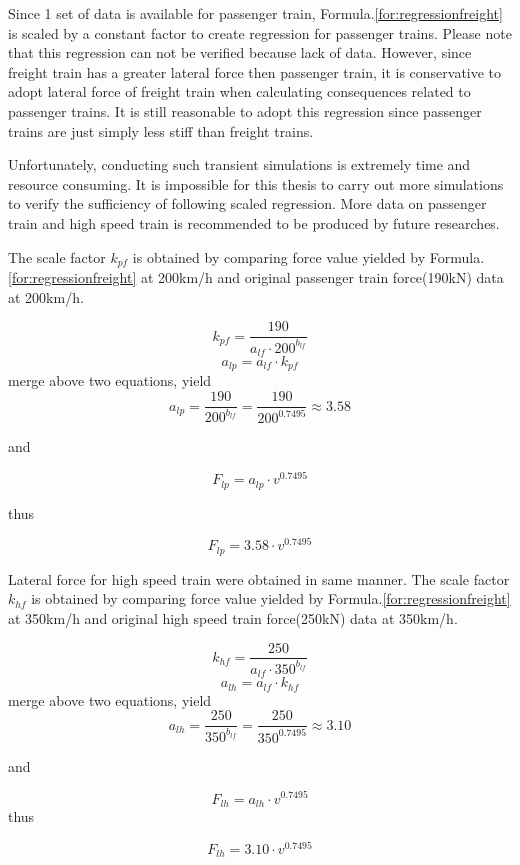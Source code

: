Since 1 set of data is available for passenger train, Formula.\ref{for:regressionfreight} is scaled by a constant factor to create regression for passenger trains. Please note that this regression can not be verified because lack of data. However, since freight train has a greater lateral force then passenger train, it is conservative to adopt lateral force of freight train when calculating consequences related to passenger trains. It is still reasonable to adopt this regression since passenger trains are just simply less stiff than freight trains. 

Unfortunately, conducting such transient simulations is extremely time and resource consuming. It is impossible for this thesis to carry out more simulations to verify the sufficiency of following scaled regression. More data on passenger train and high speed train is recommended to be produced by future researches.

The scale factor $k_{pf}$ is obtained by comparing force value yielded by Formula.\ref{for:regressionfreight} at 200km/h and original passenger train force(190kN) data at 200km/h.

$$k_{pf} = \frac{190}{a_{lf}\cdot 200^{b_{lf}}}$$
$$a_{lp} = a_{lf}\cdot k_{pf}$$
merge above two equations, yield
$$a_{lp} = \frac{190}{200^{b_{lf}}} = \frac{190}{200^{0.7495}} \approx 3.58$$

and 

$$F_{lp} = a_{lp}\cdot v^{0.7495}$$

thus

\begin{equation}\label{for:regressionpassenger}
F_{lp} = 3.58\cdot v^{0.7495}
\end{equation}

Lateral force for high speed train were obtained in same manner. The scale factor $k_{hf}$ is obtained by comparing force value yielded by Formula.\ref{for:regressionfreight} at 350km/h and original high speed train force(250kN) data at 350km/h.

$$k_{hf} = \frac{250}{a_{lf}\cdot 350^{b_{lf}}}$$
$$a_{lh} = a_{lf}\cdot k_{hf}$$
merge above two equations, yield
$$a_{lh} = \frac{250}{350^{b_{lf}}} = \frac{250}{350^{0.7495}} \approx 3.10$$

and 

$$F_{lh} = a_{lh}\cdot v^{0.7495}$$
thus

\begin{equation}\label{for:regressionhighspeed}
F_{lh} = 3.10\cdot v^{0.7495}
\end{equation}


